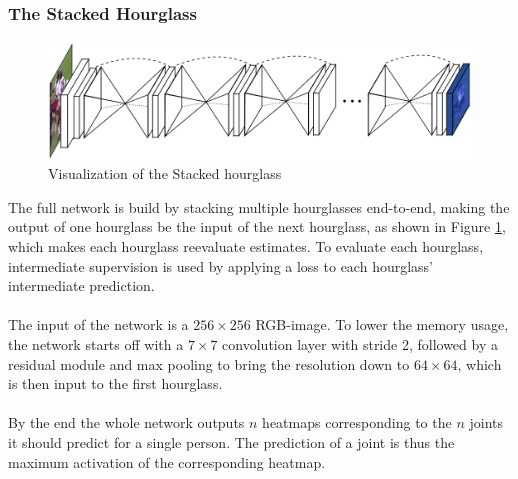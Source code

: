 \documentclass[./main.tex]{subfiles}
\begin{document}
\subsubsection{The Stacked Hourglass}
\begin{figure}[h]
    \centering
    \includegraphics[height = 4 cm]{entities/SHG.png}
    \caption{Visualization of the Stacked hourglass \cite{Newell}}
    \label{fig:SHG}
\end{figure}
\noindent The full network is build by stacking multiple hourglasses end-to-end, making the output of one hourglass be the input of the next hourglass, as shown in Figure \ref{fig:SHG}, which makes each hourglass reevaluate estimates. To evaluate each hourglass, intermediate supervision is used by applying a loss to each hourglass' intermediate prediction.
\\
\\
The input of the network is a $256 \times 256$ RGB-image. To lower the memory usage, the network starts off with a $7 \times 7$ convolution layer with stride 2, followed by a residual module and max pooling to bring the resolution down to $64 \times 64$, which is then input to the first hourglass.
\\
\\
By the end the whole network outputs $n$ heatmaps corresponding to the $n$ joints it should predict for a single person. The prediction of a joint is thus the maximum activation of the corresponding heatmap.
\end{document}

